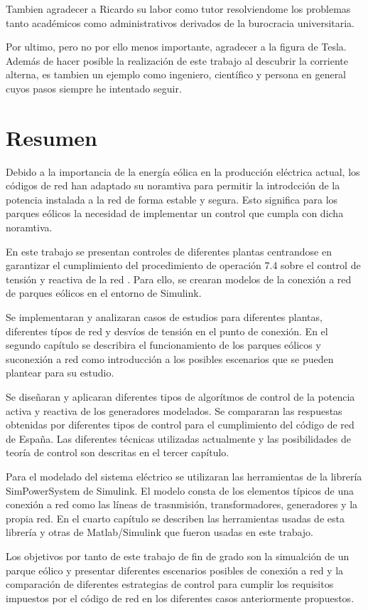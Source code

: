 \documentclass{book}
\begin{document}
Tambien agradecer a Ricardo su labor como tutor resolviendome los problemas tanto acad\'emicos como administrativos derivados de la burocracia universitaria. 

Por ultimo, pero no por ello menos importante, agradecer a la figura de Tesla. Adem\'as de hacer posible la realizaci\'on de este trabajo al descubrir la corriente alterna, es tambien un ejemplo como ingeniero, cient\'ifico y persona en general cuyos pasos siempre he intentado seguir.

\chapter*{Resumen}

Debido a la importancia de la energ\'ia e\'olica en la producci\'on el\'ectrica actual, los c\'odigos de red han adaptado su noramtiva para permitir la introdcci\'on de la potencia instalada a la red de forma estable y segura. Esto significa para los parques e\'olicos la necesidad de implementar un control que cumpla con dicha noramtiva. \par
En este trabajo se presentan controles de diferentes plantas centrandose en garantizar el cumplimiento del procedimiento de operaci\'on 7.4 sobre el control de tensi\'on y reactiva de la red \cite{PO74}. Para ello, se crearan modelos de la conexi\'on a red de parques e\'olicos en el entorno de Simulink. \par
Se implementaran y analizaran casos de estudios para diferentes plantas, diferentes t\'ipos de red y desv\'ios de tensi\'on en el punto de conexi\'on. En el segundo cap\'itulo se describira el funcionamiento de los parques e\'olicos y suconexi\'on a red como introducci\'on a los posibles escenarios que se pueden plantear para su estudio. \par
Se diseñaran y aplicaran diferentes tipos de algor\'itmos de control de la potencia activa y reactiva de los generadores modelados. Se compararan las respuestas obtenidas por diferentes tipos de control para el cumplimiento del c\'odigo de red de España. Las diferentes t\'ecnicas utilizadas actualmente y las posibilidades de teor\'ia de control son descritas en el tercer cap\'itulo. \par
Para el modelado del sistema el\'ectrico se utilizaran las herramientas de la librer\'ia SimPowerSystem de Simulink. El modelo consta de los elementos t\'ipicos de una conexi\'on a red como las l\'ineas de trasnmisi\'on, transformadores, generadores y la propia red. En el cuarto cap\'itulo se describen las herramientas usadas de esta librer\'ia y otras de Matlab/Simulink que fueron usadas en este trabajo. \par
Los objetivos por tanto de este trabajo de fin de grado son la simualci\'on de un parque e\'olico y presentar diferentes escenarios posibles de conexi\'on a red y la comparaci\'on de diferentes estrategias de control para cumplir los requisitos impuestos por el c\'odigo de red en los diferentes casos anteriormente propuestos. \par
\end{document}
